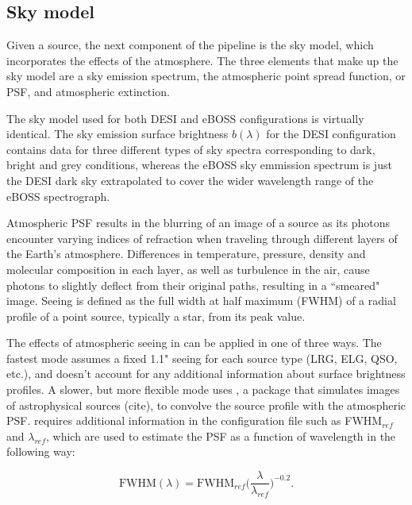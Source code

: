 \subsection{Sky model}
Given a source, the next component of the  pipeline is the sky model, which incorporates the effects of the atmosphere. The three elements that make up the sky model are a sky emission spectrum, the atmospheric point spread function, or PSF, and atmospheric extinction.


The sky model used for both DESI and eBOSS configurations is virtually identical. The sky emission surface brightness $b(\lambda)$ for the DESI configuration contains data for three different types of sky spectra corresponding to dark, bright and grey conditions, whereas the eBOSS sky emmission spectrum is just the DESI dark sky extrapolated to cover the wider wavelength range of the eBOSS spectrograph.

Atmospheric PSF results in the blurring of an image of a source as its photons encounter varying indices of refraction when traveling through different layers of the Earth's atmosphere. Differences in temperature, pressure, density and molecular composition in each layer, as well as turbulence in the air, cause photons to slightly deflect from their original paths, resulting in a ``smeared" image. Seeing is defined as the full width at half maximum (FWHM) of a radial profile of a point source, typically a star, from its peak value.

The effects of atmospheric seeing in  can be applied in one of three ways. The fastest mode assumes a fixed 1.1" seeing for each source type (LRG, ELG, QSO, etc.), and doesn't account for any additional information about surface brightness profiles. A slower, but more flexible mode uses , a package that simulates images of astrophysical sources (cite), to convolve the source profile with the atmospheric PSF.  requires additional information in the configuration file such as FWHM$_{ref}$ and $\lambda_{ref}$, which are used to estimate the PSF as a function of wavelength in the following way:

\begin{equation}
    \mbox{FWHM}(\lambda) = \mbox{FWHM}_{ref} \Big(\frac{\lambda}{\lambda_{ref}}\Big)^{-0.2}.
\end{equation}

